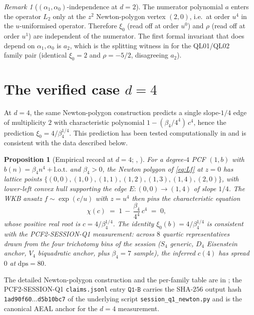 \documentclass[11pt,reqno]{amsart}
\theoremstyle{plain}
\newtheorem{proposition}[theorem]{Proposition}
\theoremstyle{definition}
\theoremstyle{remark}
\newtheorem{remark}[theorem]{Remark}
\newcommand{\dps}{\mathrm{dps}}
\begin{document}
\begin{remark}[$(\alpha_1, \alpha_0)$-independence at $d = 2$]
\label{rem:numerator-indep}
The numerator polynomial $a$ enters the operator $L_2$ only
at the $z^2$ Newton-polygon vertex $(2,0)$, i.e.\ at order
$u^4$ in the $u$-uniformised operator. Therefore $\xi_0$
(read off at order $u^0$) and $\rho$ (read off at order
$u^1$) are independent of the numerator. The first formal
invariant that does depend on $\alpha_1, \alpha_0$ is $a_2$,
which is the splitting witness in
\cite[Prop.~3.3.B]{siarc_channel_theory_v13} for the
QL01/QL02 family pair (identical $\xi_0 = 2$ and $\rho = -5/2$,
disagreeing $a_2$).
\end{remark}

\section{The verified case \texorpdfstring{$d = 4$}{d=4}}
\label{sec:d4}

At $d = 4$, the same Newton-polygon construction predicts a
single slope-$1/4$ edge of multiplicity $2$ with
characteristic polynomial $1 - (\beta_4/4^4)\,c^4$, hence
the prediction $\xi_0 = 4/\beta_4^{1/4}$. This prediction
has been tested computationally in
\cite{papanokechi_pcf2_v13} and is consistent with the data
described below.

\begin{proposition}[Empirical record at $d = 4$;
{\cite[Prop.~3.3.A$'$]{siarc_channel_theory_v13},
\cite{papanokechi_pcf2_v13}}]
\label{prop:xi0-d4}
For a degree-$4$ PCF $(1, b)$ with
$b(n) = \beta_4 n^4 + \mathrm{l.o.t.}$ and $\beta_4 > 0$,
the Newton polygon of \eqref{eq:Lf} at $z = 0$ has lattice
points
$\{(0,0),(1,0),(1,1),(1,2),(1,3),(1,4),(2,0)\}$, with
lower-left convex hull supporting the edge
$E:(0,0) \to (1,4)$ of slope $1/4$. The WKB ansatz
$f \sim \exp(c/u)$ with $z = u^4$ then pins the
characteristic equation
\[
  \chi(c) \;=\; 1 \,-\, \frac{\beta_4}{4^4}\,c^4 \;=\; 0,
\]
whose positive real root is $c = 4/\beta_4^{1/4}$. The
identity $\xi_0(b) = 4/\beta_4^{1/4}$ is consistent with
the PCF2-SESSION-Q1 measurement: across $8$ quartic
representatives drawn from the four trichotomy bins of
the session ($S_4$ generic, $D_4$ Eisenstein anchor,
$V_4$ biquadratic anchor, plus $\beta_4 = 7$ sample), the
inferred $c(4)$ has spread $0$ at $\dps = 80$.
\end{proposition}

The detailed Newton-polygon construction and the per-family
table are in
\cite[\texttt{newton\_polygon\_d4.tex}]{papanokechi_pcf2_v13};
the PCF2-SESSION-Q1 \texttt{claims.jsonl} entry
$\texttt{Q1-B}$ carries the SHA-$256$ output hash
\texttt{1ad90f60$\dots$d5b10bc7} of the underlying script
\texttt{session\_q1\_newton.py} and is the canonical AEAL
anchor for the $d = 4$ measurement.
\end{document}
